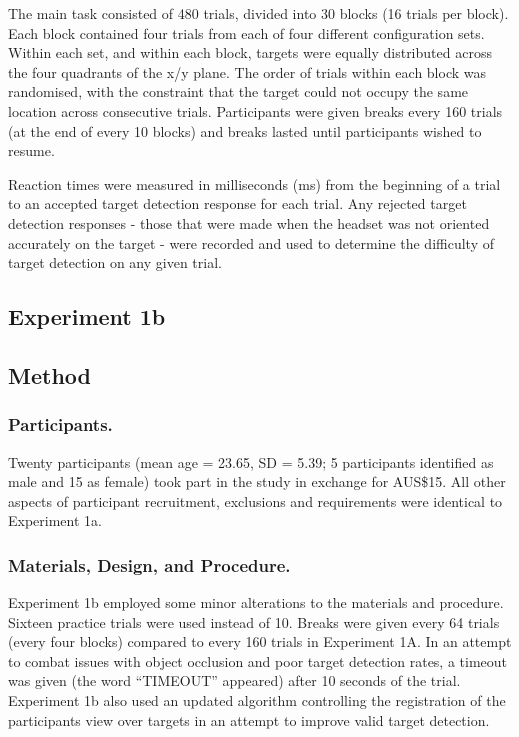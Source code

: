 \documentclass[
  english,
  man,floatsintext]{apa7}
\begin{document}
The main task consisted of 480 trials, divided into 30 blocks (16 trials per block). Each block contained four trials from each of four different configuration sets. Within each set, and within each block, targets were equally distributed across the four quadrants of the x/y plane. The order of trials within each block was randomised, with the constraint that the target could not occupy the same location across consecutive trials. Participants were given breaks every 160 trials (at the end of every 10 blocks) and breaks lasted until participants wished to resume.

Reaction times were measured in milliseconds (ms) from the beginning of a trial to an accepted target detection response for each trial. Any rejected target detection responses - those that were made when the headset was not oriented accurately on the target - were recorded and used to determine the difficulty of target detection on any given trial.

\hypertarget{experiment-1b}{%
\subsection{Experiment 1b}\label{experiment-1b}}

\hypertarget{method-1}{%
\subsection{Method}\label{method-1}}

\hypertarget{participants.-1}{%
\subsubsection{Participants.}\label{participants.-1}}

Twenty participants (mean age = 23.65, SD = 5.39; 5 participants identified as male and 15 as female) took part in the study in exchange for AUS\$15. All other aspects of participant recruitment, exclusions and requirements were identical to Experiment 1a.

\hypertarget{materials-design-and-procedure.}{%
\subsubsection{Materials, Design, and Procedure.}\label{materials-design-and-procedure.}}

Experiment 1b employed some minor alterations to the materials and procedure. Sixteen practice trials were used instead of 10. Breaks were given every 64 trials (every four blocks) compared to every 160 trials in Experiment 1A. In an attempt to combat issues with object occlusion and poor target detection rates, a timeout was given (the word ``TIMEOUT'' appeared) after 10 seconds of the trial. Experiment 1b also used an updated algorithm controlling the registration of the participants view over targets in an attempt to improve valid target detection.
\end{document}
